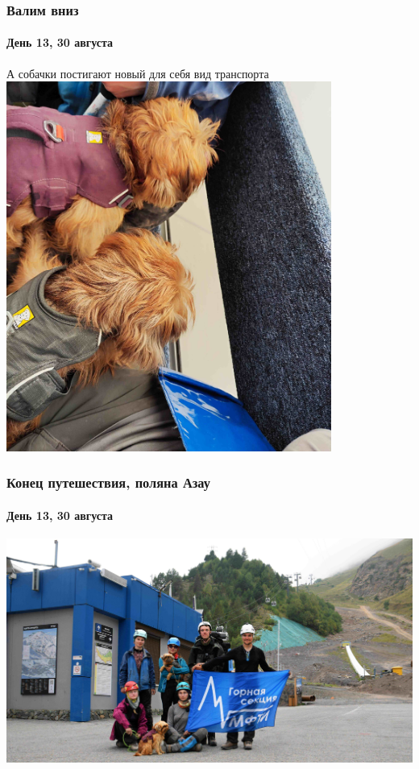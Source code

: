 \begin{frame}
	\frametitle{Валим вниз}
	\framesubtitle{День 13, 30 августа}
	\footnotesize А собачки постигают новый для себя вид транспорта
	\centering
	\includegraphics[width=0.8\textwidth]{../pics/IMG_20240830_170232}			
\end{frame}

\begin{frame}
	\frametitle{Конец путешествия, поляна Азау}
	\framesubtitle{День 13, 30 августа}	
	\centering
	\includegraphics[width=\textwidth]{../pics/group_finish.jpg}			
\end{frame}